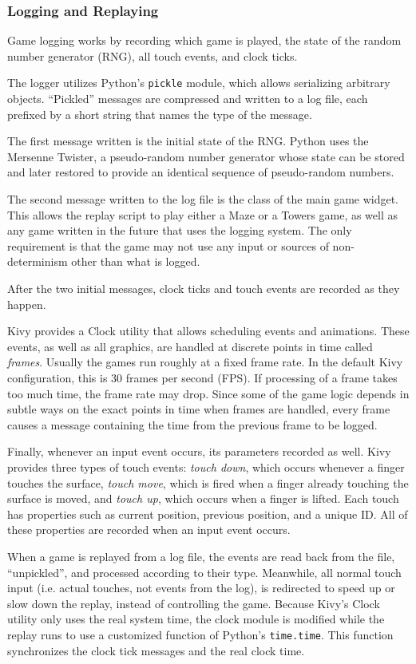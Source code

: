 \documentclass[a4paper,11pt]{article}
\begin{document}
\subsubsection{Logging and Replaying}

Game logging works by recording which game is played, the state of the random
number generator (RNG), all touch events, and clock ticks.

The logger utilizes Python's \texttt{pickle} module, which allows serializing
arbitrary objects.
“Pickled” messages are compressed and written to a log file, each prefixed by
a short string that names the type of the message.

The first message written is the initial state of the RNG.
Python uses the Mersenne Twister, a pseudo-random number generator whose state
can be stored and later restored to provide an identical sequence of
pseudo-random numbers.

The second message written to the log file is the class of the main game
widget.
This allows the replay script to play either a Maze or a Towers game,
as well as any game written in the future that uses the logging system.
The only requirement is that the game may not use any input or sources of
non-determinism other than what is logged.

After the two initial messages, clock ticks and touch events are recorded as
they happen.

Kivy provides a Clock utility that allows scheduling events and animations.
These events, as well as all graphics, are handled at discrete points in time
called \emph{frames}.
Usually the games run roughly at a fixed frame rate.
In the default Kivy configuration, this is 30 frames per second (FPS).
If processing of a frame takes too much time, the frame rate may drop.
Since some of the game logic depends in subtle ways on the exact points in time
when frames are handled, every frame causes a message containing the time from
the previous frame to be logged.

Finally, whenever an input event occurs, its parameters recorded as well.
Kivy provides three types of touch events: \emph{touch down}, which occurs
whenever a finger touches the surface, \emph{touch move}, which is fired when
a finger already touching the surface is moved, and \emph{touch up}, which
occurs when a finger is lifted.
Each touch has properties such as current position, previous position, and a
unique ID.
All of these properties are recorded when an input event occurs.

When a game is replayed from a log file, the events are read back from the
file, “unpickled”, and processed according to their type.
Meanwhile, all normal touch input (i.e. actual touches, not events from the
log), is redirected to speed up or slow down the replay,
instead of controlling the game.
Because Kivy's Clock utility only uses the real system time, the clock module
is modified while the replay runs to use a customized function of Python's
\texttt{time.time}.
This function synchronizes the clock tick messages and the real clock time.
\end{document}
